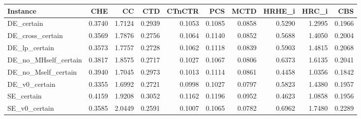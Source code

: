 \begin{tabular}{lrrrrrrrrr}
\toprule
Instance & CHE & CC & CTD & CTnCTR & PCS & MCTD & HRHE_i & HRC_i & CBS \\
\midrule
DE_certain & 0.3740 & 1.7124 & 0.2939 & 0.1053 & 0.1085 & 0.0858 & 0.5290 & 1.2995 & 0.1966 \\
DE_cross_certain & 0.3569 & 1.7876 & 0.2756 & 0.1064 & 0.1140 & 0.0852 & 0.5688 & 1.4050 & 0.2004 \\
DE_lp_certain & 0.3573 & 1.7757 & 0.2728 & 0.1062 & 0.1118 & 0.0839 & 0.5903 & 1.4815 & 0.2068 \\
DE_no_MHself_certain & 0.3817 & 1.8575 & 0.2717 & 0.1027 & 0.1067 & 0.0806 & 0.6373 & 1.6135 & 0.2041 \\
DE_no_Mself_certain & 0.3940 & 1.7045 & 0.2973 & 0.1013 & 0.1114 & 0.0861 & 0.4458 & 1.0356 & 0.1842 \\
DE_v0_certain & 0.3355 & 1.6992 & 0.2721 & 0.0998 & 0.1027 & 0.0797 & 0.5823 & 1.4380 & 0.1957 \\
SE_certain & 0.4159 & 1.9208 & 0.3052 & 0.1162 & 0.1196 & 0.0952 & 0.4623 & 1.0858 & 0.1956 \\
SE_v0_certain & 0.3585 & 2.0449 & 0.2591 & 0.1007 & 0.1065 & 0.0782 & 0.6962 & 1.7480 & 0.2289 \\
\bottomrule
\end{tabular}
